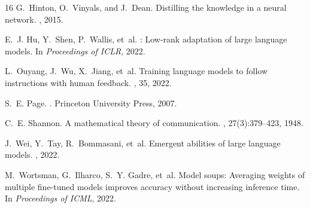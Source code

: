 \documentclass[11pt,a4paper]{article}
\begin{document}
\begin{thebibliography}{16}
G.~Hinton, O.~Vinyals, and J.~Dean.
\newblock Distilling the knowledge in a neural network.
, 2015.

E.~J. Hu, Y.~Shen, P.~Wallis, et~al.
: Low-rank adaptation of large language models.
\newblock In {\em Proceedings of ICLR}, 2022.

L.~Ouyang, J.~Wu, X.~Jiang, et~al.
\newblock Training language models to follow instructions with human feedback.
, 35, 2022.

S.~E. Page.
.
\newblock Princeton University Press, 2007.

C.~E. Shannon.
\newblock A mathematical theory of communication.
, 27(3):379--423, 1948.

J.~Wei, Y.~Tay, R.~Bommasani, et~al.
\newblock Emergent abilities of large language models.
, 2022.

M.~Wortsman, G.~Ilharco, S.~Y. Gadre, et~al.
\newblock Model soups: Averaging weights of multiple fine-tuned models improves
  accuracy without increasing inference time.
\newblock In {\em Proceedings of ICML}, 2022.

\end{thebibliography}
\end{document}
